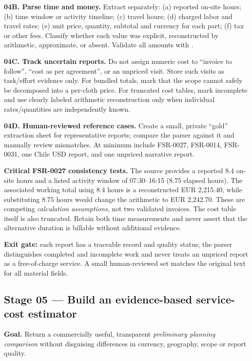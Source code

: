 \documentclass[11pt,a4paper]{article}
\DeclareRobustCommand{\code}[1]{{\ttfamily\small\detokenize{#1}}}
\begin{document}
\textbf{04B. Parse time and money.} Extract separately: (a) reported on-site hours; (b) time window or activity timeline; (c) travel hours; (d) charged labor and travel rates; (e) unit price, quantity, subtotal and currency for each part; (f) tax or other fees. Classify whether each value was explicit, reconstructed by arithmetic, approximate, or absent. Validate all amounts with \code{Decimal}.

\textbf{04C. Track uncertain reports.} Do not assign numeric cost to ``invoice to follow'', ``cost as per agreement'', or an unpriced visit. Store such visits as task/effort evidence only. For bundled totals, mark that the scope cannot safely be decomposed into a per-cloth price. For truncated cost tables, mark incomplete and use clearly labeled arithmetic reconstruction only when individual rates/quantities are independently known.

\textbf{04D. Human-reviewed reference cases.} Create a small, private ``gold'' extraction sheet for representative reports; compare the parser against it and manually review mismatches. At minimum include FSR-0027, FSR-0014, FSR-0031, one Chile USD report, and one unpriced narrative report.

\begin{warnbox}
\textbf{Critical FSR-0027 consistency tests.} The source provides a reported \(8.4\) on-site hours and a listed activity window of 07:30--16:15 (\(8.75\) elapsed hours). The associated working total using \(8.4\) hours is a reconstructed EUR 2,215.40, while substituting \(8.75\) hours would change the arithmetic to EUR 2,242.70. These are competing \emph{calculation assumptions}, not two validated invoices. The cost table itself is also truncated. Retain both time measurements and never assert that the alternative duration is billable without additional evidence.
\end{warnbox}

\textbf{Exit gate:} each report has a traceable record and quality status; the parser distinguishes completed and incomplete work and never treats an unpriced report as a free-of-charge service. A small human-reviewed set matches the original text for all material fields.

\subsection{Stage 05 --- Build an evidence-based service-cost estimator}
\textbf{Goal.} Return a commercially useful, transparent \emph{preliminary planning comparison} without disguising differences in currency, geography, scope or report quality.
\end{document}
